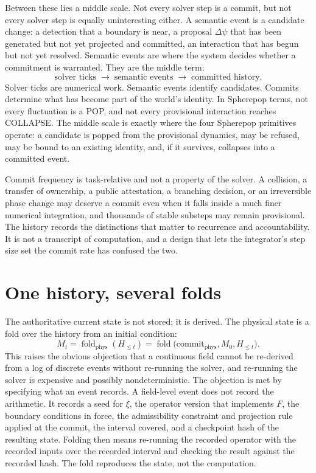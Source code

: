 \documentclass[11pt]{article}
\DeclareMathOperator{\fold}{fold}
\begin{document}
Between these lies a middle scale. Not every solver step is a commit, but not every solver step is equally uninteresting either. A semantic event is a candidate change: a detection that a boundary is near, a proposal $\Delta\psi$ that has been generated but not yet projected and committed, an interaction that has begun but not yet resolved. Semantic events are where the system decides whether a commitment is warranted. They are the middle term:
\[
\text{solver ticks} \;\longrightarrow\; \text{semantic events} \;\longrightarrow\; \text{committed history}.
\]
Solver ticks are numerical work. Semantic events identify candidates. Commits determine what has become part of the world's identity. In Spherepop terms, not every fluctuation is a POP, and not every provisional interaction reaches COLLAPSE. The middle scale is exactly where the four Spherepop primitives operate: a candidate is popped from the provisional dynamics, may be refused, may be bound to an existing identity, and, if it survives, collapses into a committed event.

Commit frequency is task-relative and not a property of the solver. A collision, a transfer of ownership, a public attestation, a branching decision, or an irreversible phase change may deserve a commit even when it falls inside a much finer numerical integration, and thousands of stable substeps may remain provisional. The history records the distinctions that matter to recurrence and accountability. It is not a transcript of computation, and a design that lets the integrator's step size set the commit rate has confused the two.

\section{One history, several folds}

The authoritative current state is not stored; it is derived. The physical state is a fold over the history from an initial condition:
\[
M_t = \fold_{\mathrm{phys}}(H_{\leq t}) = \fold\bigl(\mathrm{commit}_{\mathrm{phys}}, M_0, H_{\leq t}\bigr).
\]
This raises the obvious objection that a continuous field cannot be re-derived from a log of discrete events without re-running the solver, and re-running the solver is expensive and possibly nondeterministic. The objection is met by specifying what an event records. A field-level event does not record the arithmetic. It records a seed for $\xi$, the operator version that implements $F$, the boundary conditions in force, the admissibility constraint and projection rule applied at the commit, the interval covered, and a checkpoint hash of the resulting state. Folding then means re-running the recorded operator with the recorded inputs over the recorded interval and checking the result against the recorded hash. The fold reproduces the state, not the computation.
\end{document}
